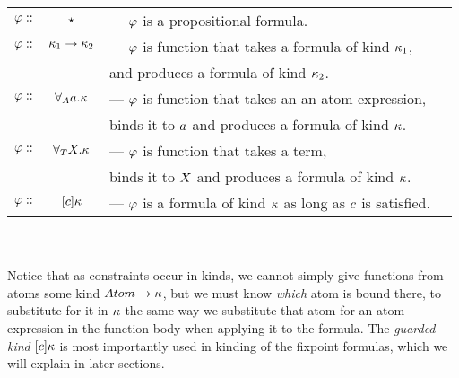 \documentclass[english, mgr]{iithesis}
\renewcommand{\it}[1]{\textit{#1}}
\begin{document}
\begin{tabular}{rclr}
$\varphi ::$ & $\star$ & ---  $\varphi$ is a propositional formula. \\
$\varphi ::$ & $\kappa_1 \to \kappa_2$ & ---  $\varphi$ is function that takes a formula of kind $\kappa_1$, \\
  & &  and produces a formula of kind $\kappa_2$. \\
$\varphi ::$ & $\forall_A a . \kappa$ & ---  $\varphi$ is function that takes an an atom expression, \\
  & &  binds it to $a$ and produces a formula of kind $\kappa$.\\
$\varphi ::$ & $\forall_T X . \kappa$ & ---  $\varphi$ is function that takes a term, \\
  & &  binds it to $X$ and produces a formula of kind $\kappa$.\\
$\varphi ::$ & $[c] \kappa$ & ---  $\varphi$ is a formula of kind $\kappa$ as long as $c$ is satisfied.
\end{tabular}
\\ \\
Notice that as constraints occur in kinds, we cannot simply give functions
from atoms some kind ${Atom}\to\kappa$, but we must know \it{which} atom
is bound there, to substitute for it in $\kappa$ the same way we substitute
that atom for an atom expression in the function body when applying it to the formula.
The \it{guarded kind} $[c] \kappa$ is most importantly used in
kinding of the fixpoint formulas, which we will explain in later sections.
\end{document}

